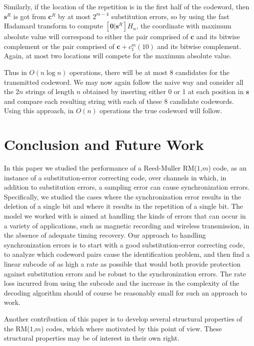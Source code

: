 Similarly, if the location of the repetition  is in the first half
of the codeword, then $\mathbf{s}^R$ is got from $\mathbf{c}^R$ by
at most  $2^{m-4}$ substitution errors, so by using the fast
Hadamard transform to compute $\left[ \mathbf{0} | \mathbf{s}^R
\right] H_n$, the coordinate with maximum absolute value will
correspond to either the pair comprised of $\mathbf{c}$ and its
bitwise complement or the pair comprised of $\mathbf{c} +
c_1^m(10)$ and its bitwise complement. Again, at most two
locations will compete for the maximum absolute value.

Thus in $O(n \log n)$ operations, there will be at most $8$
candidates for the transmitted codeword. We may now again follow
the naive way and consider all the $2n$ strings of length $n$
obtained by inserting either 0 or 1 at each position in
$\mathbf{s}$ and compare each resulting string with each of these
$8$ candidate codewords. Using this approach, in $O(n)$ operations
the true codeword will follow.


\section{Conclusion and Future Work}\label{section6}

In this paper we studied the performance of a Reed-Muller RM($1$,$m$)
code, as an instance of a substitution-error correcting code, over
channels in which, in addition to substitution errors,
a sampling error can cause synchronization
errors. Specifically, we studied the cases
where the synchronization error results in the
deletion of a single bit and where it
results in the repetition of a single bit.
The model we worked with
is aimed at handling the kinds of errors that
can occur in a variety of
applications, such as magnetic recording and wireless
transmission, in the absence of adequate timing recovery.
Our approach to handling synchronization errors is to
start with a good substitution-error correcting code,
to analyze which codeword pairs cause the identification
problem, and then find a
linear subcode of as high a rate as possible that would
both provide protection against substitution
errors and be robust to the synchronization errors.
The rate loss incurred from using the subcode
and the increase in the complexity of the decoding algorithm
should of course be reasonably small for such an approach to work.

Another contribution of this paper is
to develop
several structural properties of the RM($1$,$m$)
codes, which where motivated by this point of view.
These structural properties may be of interest
in their own right.

